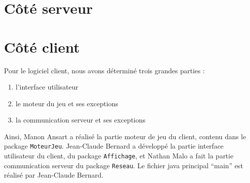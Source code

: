 \section{Côté serveur}

\section{Côté client}
	Pour le logiciel client, nous avons déterminé trois grandes parties :
	\begin{enumerate}
		\item l'interface utilisateur
		\item le moteur du jeu et ses exceptions
		\item la communication serveur et ses exceptions
	\end{enumerate}

	Ainsi, Manon Ansart a réalisé la partie moteur de jeu du client, contenu dans le package \texttt{MoteurJeu}. Jean-Claude Bernard a développé la partie interface utilisateur du client, du package \texttt{Affichage}, et Nathan Malo a fait la partie communication serveur du package \texttt{Reseau}. Le fichier java principal \enquote{main} est réalisé par Jean-Claude Bernard.
